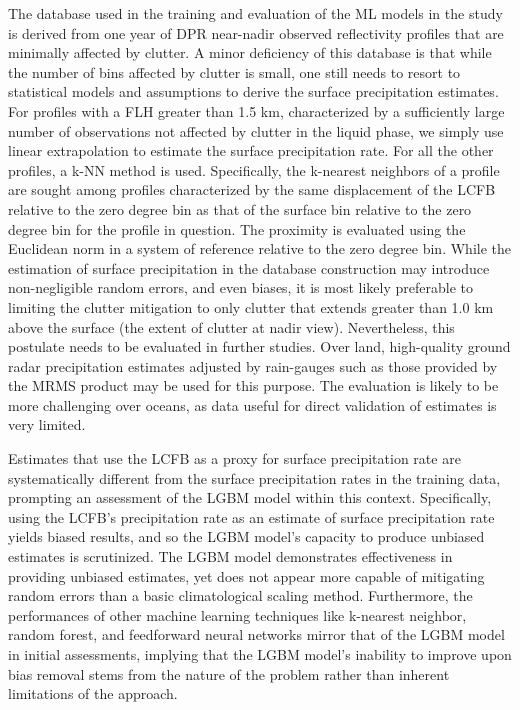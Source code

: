 \documentclass{ametsocV6.1} %
\begin{document}
The database used in the training and evaluation of the ML models in the study is derived from one year of DPR near-nadir observed reflectivity profiles that are minimally affected by clutter. A minor deficiency of this database is that while the number of bins affected by clutter is small, one still needs to resort to statistical models and assumptions to derive the surface precipitation estimates. For profiles with a FLH greater than 1.5 km, characterized by a sufficiently large number of observations not affected by clutter in the liquid phase, we simply use linear extrapolation to estimate the surface precipitation rate.  For all the other profiles, a k-NN method is used. Specifically, the k-nearest neighbors of a profile are sought among profiles characterized by the same displacement of the LCFB relative to the zero degree bin as that of the surface bin relative to the zero degree bin for the profile in question. The proximity is evaluated using the Euclidean norm in a system of reference relative to the zero degree bin. While the estimation of surface precipitation in the database construction may introduce non-negligible random errors, and even biases, it is most likely preferable to limiting the clutter mitigation to only clutter that extends greater than 1.0 km above the surface (the extent of clutter at nadir view).  Nevertheless, this postulate needs to be evaluated in further studies. Over land, high-quality ground radar precipitation estimates adjusted by rain-gauges such as those provided by the MRMS product \citep{zhang2016} may be used for this purpose. The evaluation is likely to be more challenging over oceans, as data useful for direct validation of estimates is very limited.

Estimates that use the LCFB as a proxy for surface precipitation rate are systematically different from the surface precipitation rates in the training data, prompting an assessment of the LGBM model within this context. Specifically, using the LCFB's precipitation rate as an estimate of surface precipitation rate yields biased results, and so the LGBM model's capacity to produce unbiased estimates is scrutinized. The LGBM model demonstrates effectiveness in providing unbiased estimates, yet does not appear more capable of mitigating random errors than a basic climatological scaling method. Furthermore, the performances of other machine learning techniques like k-nearest neighbor, random forest, and feedforward neural networks mirror that of the LGBM model in initial assessments, implying that the LGBM model's inability to improve upon bias removal stems from the nature of the problem rather than inherent limitations of the approach.
\end{document}
